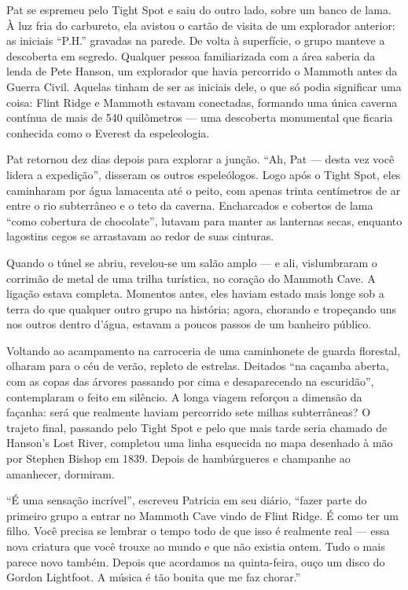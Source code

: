 \documentclass[12pt,a4paper]{article}
\begin{document}
Pat se espremeu pelo Tight Spot e saiu do outro lado, sobre um banco de lama. À luz fria do carbureto, ela avistou o cartão de visita de um explorador anterior: as iniciais “P.H.” gravadas na parede.
De volta à superfície, o grupo manteve a descoberta em segredo.
Qualquer pessoa familiarizada com a área saberia da lenda de Pete Hanson, um explorador que havia percorrido o Mammoth antes da Guerra Civil.
Aquelas tinham de ser as iniciais dele, o que só podia significar uma coisa: Flint Ridge e Mammoth estavam conectadas, formando uma única caverna contínua de mais de 540 quilômetros — uma descoberta monumental que ficaria conhecida como o Everest da espeleologia.

Pat retornou dez dias depois para explorar a junção.
“Ah, Pat — desta vez você lidera a expedição”, disseram os outros espeleólogos.
Logo após o Tight Spot, eles caminharam por água lamacenta até o peito, com apenas trinta centímetros de ar entre o rio subterrâneo e o teto da caverna.
Encharcados e cobertos de lama “como cobertura de chocolate”, lutavam para manter as lanternas secas, enquanto lagostins cegos se arrastavam ao redor de suas cinturas.

Quando o túnel se abriu, revelou-se um salão amplo — e ali, vislumbraram o corrimão de metal de uma trilha turística, no coração do Mammoth Cave.
A ligação estava completa.
Momentos antes, eles haviam estado mais longe sob a terra do que qualquer outro grupo na história; agora, chorando e tropeçando uns nos outros dentro d’água, estavam a poucos passos de um banheiro público.

Voltando ao acampamento na carroceria de uma caminhonete de guarda florestal, olharam para o céu de verão, repleto de estrelas.
Deitados “na caçamba aberta, com as copas das árvores passando por cima e desaparecendo na escuridão”, contemplaram o feito em silêncio.
A longa viagem reforçou a dimensão da façanha: será que realmente haviam percorrido sete milhas subterrâneas?
O trajeto final, passando pelo Tight Spot e pelo que mais tarde seria chamado de Hanson’s Lost River, completou uma linha esquecida no mapa desenhado à mão por Stephen Bishop em 1839.
Depois de hambúrgueres e champanhe ao amanhecer, dormiram.

“É uma sensação incrível”, escreveu Patricia em seu diário,
“fazer parte do primeiro grupo a entrar no Mammoth Cave vindo de Flint Ridge.
É como ter um filho. Você precisa se lembrar o tempo todo de que isso é realmente real — essa nova criatura que você trouxe ao mundo e que não existia ontem.
Tudo o mais parece novo também.
Depois que acordamos na quinta-feira, ouço um disco do Gordon Lightfoot.
A música é tão bonita que me faz chorar.”
\end{document}
